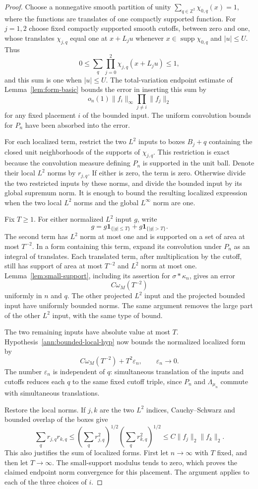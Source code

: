 \documentclass[11pt]{amsart}
\newcommand{\one}{\mathbf 1}
\theoremstyle{definition}
\theoremstyle{remark}
\numberwithin{equation}{section}
\begin{document}
\begin{proof}
Choose a nonnegative smooth partition of unity
$\sum_{q\in\mathbb Z^2}\chi_{0,q}(x)=1$, where the functions
are translates of one compactly supported function. For $j=1,2$
choose fixed compactly supported smooth cutoffs, between zero
and one, whose translates $\chi_{j,q}$ equal one at $x+L_ju$
whenever $x\in\operatorname{supp}\chi_{0,q}$ and $|u|\le U$.
Thus
\[
 0\le\sum_q\prod_{j=0}^2\chi_{j,q}(x+L_ju)\le1,
\]
and this sum is one when $|u|\le U$.
The total-variation endpoint estimate of
Lemma~\ref{lem:form-basic} bounds the error in inserting this
sum by
\[
 o_n(1)\|f_i\|_\infty\prod_{j\ne i}\|f_j\|_2
\]
for any fixed placement $i$ of the bounded input. The uniform
convolution bounds for $P_n$ have been absorbed into the error.

For each localized term, restrict the two $L^2$ inputs to boxes
$B_j+q$ containing the closed unit neighborhoods of the supports
of $\chi_{j,q}$. This restriction is exact because the convolution
measure defining $P_n$ is supported in the unit ball. Denote
their local $L^2$ norms by $r_{j,q}$. If either is zero, the term
is zero. Otherwise divide the two restricted inputs by these
norms, and divide the bounded input by its global supremum norm.
It is enough to bound the resulting localized expression when
the two local $L^2$ norms and the global $L^\infty$ norm are one.

Fix $T\ge1$. For either normalized $L^2$ input $g$, write
\[
 g=g\one_{\{|g|\le T\}}+g\one_{\{|g|>T\}}.
\]
The second term has $L^2$ norm at most one and is supported on
a set of area at most $T^{-2}$. In a form containing this term,
expand its convolution under $P_n$ as an integral of translates.
Each translated term, after multiplication by the cutoff, still
has support of area at most $T^{-2}$ and $L^2$ norm at most one.
Lemma~\ref{lem:small-support}, including its assertion for
$\sigma*\kappa_n$, gives an error
\[
 C\omega_M(T^{-2})
\]
uniformly in $n$ and $q$. The other projected $L^2$ input and the
projected bounded input have uniformly bounded norms. The same
argument removes the large part of the other $L^2$ input, with
the same type of bound.

The two remaining inputs have absolute value at most $T$.
Hypothesis~\eqref{ann:bounded-local-hyp} now bounds the normalized
localized form by
\[
 C\omega_M(T^{-2})+T^2\varepsilon_n,
 \qquad \varepsilon_n\longrightarrow0.
\]
The number $\varepsilon_n$ is independent of $q$: simultaneous
translation of the inputs and cutoffs reduces each $q$ to the
same fixed cutoff triple, since $P_n$ and $\Lambda_{\mu_n}$
commute with simultaneous translations.

Restore the local norms. If $j,k$ are the two $L^2$ indices,
Cauchy--Schwarz and bounded overlap of the boxes give
\[
 \sum_q r_{j,q}r_{k,q}
 \le\left(\sum_q r_{j,q}^2\right)^{1/2}
      \left(\sum_q r_{k,q}^2\right)^{1/2}
 \le C\|f_j\|_2\|f_k\|_2.
\]
This also justifies the sum of localized forms. First let
$n\to\infty$ with $T$ fixed, and then let $T\to\infty$.
The small-support modulus tends to zero, which proves the
claimed endpoint norm convergence for this placement. The
argument applies to each of the three choices of $i$.
\end{proof}
\end{document}
